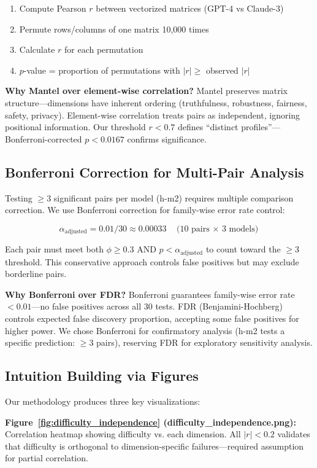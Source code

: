\begin{enumerate}
\item Compute Pearson $r$ between vectorized matrices (GPT-4 vs Claude-3)
\item Permute rows/columns of one matrix 10,000 times
\item Calculate $r$ for each permutation
\item $p$-value = proportion of permutations with $|r| \geq$ observed $|r|$
\end{enumerate}

\textbf{Why Mantel over element-wise correlation?} Mantel preserves matrix structure---dimensions have inherent ordering (truthfulness, robustness, fairness, safety, privacy). Element-wise correlation treats pairs as independent, ignoring positional information. Our threshold $r < 0.7$ defines ``distinct profiles''---Bonferroni-corrected $p < 0.0167$ confirms significance.

\subsection{Bonferroni Correction for Multi-Pair Analysis}

Testing $\geq$3 significant pairs per model (h-m2) requires multiple comparison correction. We use Bonferroni correction for family-wise error rate control:

\[
\alpha_{\text{adjusted}} = 0.01 / 30 \approx 0.00033 \quad \text{(10 pairs $\times$ 3 models)}
\]

Each pair must meet both $\phi \geq 0.3$ AND $p < \alpha_{\text{adjusted}}$ to count toward the $\geq$3 threshold. This conservative approach controls false positives but may exclude borderline pairs.

\textbf{Why Bonferroni over FDR?} Bonferroni guarantees family-wise error rate $< 0.01$---no false positives across all 30 tests. FDR (Benjamini-Hochberg) controls expected false discovery proportion, accepting some false positives for higher power. We chose Bonferroni for confirmatory analysis (h-m2 tests a specific prediction: $\geq$3 pairs), reserving FDR for exploratory sensitivity analysis.

\subsection{Intuition Building via Figures}

Our methodology produces three key visualizations:

\textbf{Figure~\ref{fig:difficulty_independence} (difficulty\_independence.png):} Correlation heatmap showing difficulty vs. each dimension. All $|r| < 0.2$ validates that difficulty is orthogonal to dimension-specific failures---required assumption for partial correlation.

